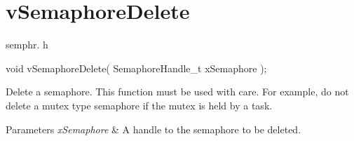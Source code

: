 \hypertarget{group__v_semaphore_delete}{}\section{v\+Semaphore\+Delete}
\label{group__v_semaphore_delete}
semphr. h 
\begin{DoxyPre}void vSemaphoreDelete( SemaphoreHandle\_t xSemaphore );\end{DoxyPre}


Delete a semaphore. This function must be used with care. For example, do not delete a mutex type semaphore if the mutex is held by a task.


\begin{DoxyParams}{Parameters}
{\em x\+Semaphore} & A handle to the semaphore to be deleted. \\
\hline
\end{DoxyParams}
